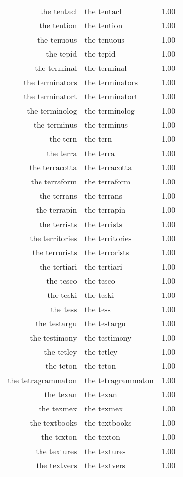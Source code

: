 \begin{table}[ht]
\begin{tabular}{rlr}
  the tentacl & the tentacl & 1.00 \\ 
  the tention & the tention & 1.00 \\ 
  the tenuous & the tenuous & 1.00 \\ 
  the tepid & the tepid & 1.00 \\ 
  the terminal & the terminal & 1.00 \\ 
  the terminators & the terminators & 1.00 \\ 
  the terminatort & the terminatort & 1.00 \\ 
  the terminolog & the terminolog & 1.00 \\ 
  the terminus & the terminus & 1.00 \\ 
  the tern & the tern & 1.00 \\ 
  the terra & the terra & 1.00 \\ 
  the terracotta & the terracotta & 1.00 \\ 
  the terraform & the terraform & 1.00 \\ 
  the terrans & the terrans & 1.00 \\ 
  the terrapin & the terrapin & 1.00 \\ 
  the terrists & the terrists & 1.00 \\ 
  the territories & the territories & 1.00 \\ 
  the terrorists & the terrorists & 1.00 \\ 
  the tertiari & the tertiari & 1.00 \\ 
  the tesco & the tesco & 1.00 \\ 
  the teski & the teski & 1.00 \\ 
  the tess & the tess & 1.00 \\ 
  the testargu & the testargu & 1.00 \\ 
  the testimony & the testimony & 1.00 \\ 
  the tetley & the tetley & 1.00 \\ 
  the teton & the teton & 1.00 \\ 
  the tetragrammaton & the tetragrammaton & 1.00 \\ 
  the texan & the texan & 1.00 \\ 
  the texmex & the texmex & 1.00 \\ 
  the textbooks & the textbooks & 1.00 \\ 
  the texton & the texton & 1.00 \\ 
  the textures & the textures & 1.00 \\ 
  the textvers & the textvers & 1.00 \\ 

\end{tabular}
\end{table}

